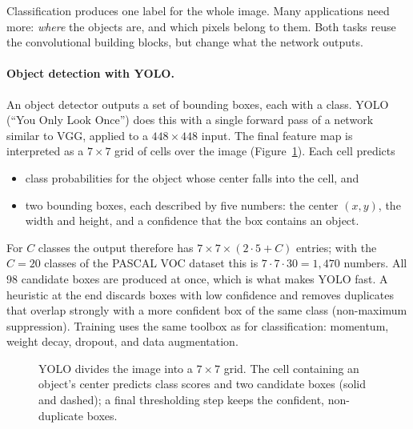 Classification produces one label for the whole image. Many applications need
more: \emph{where} the objects are, and which pixels belong to them. Both tasks
reuse the convolutional building blocks, but change what the network outputs.

\paragraph{Object detection with YOLO.}
An object detector outputs a set of bounding boxes, each with a class. YOLO
(``You Only Look Once'') does this with a single forward pass of a network
similar to VGG, applied to a $448\times448$ input. The final feature map is
interpreted as a $7\times7$ grid of cells over the image
(Figure~\ref{fig:yolo}). Each cell predicts
\begin{itemize}
  \item class probabilities for the object whose center falls into the cell, and
  \item two bounding boxes, each described by five numbers: the center $(x,y)$,
        the width and height, and a confidence that the box contains an object.
\end{itemize}
\noindent
For $C$ classes the output therefore has $7\times7\times(2\cdot5 + C)$ entries;
with the $C = 20$ classes of the PASCAL VOC dataset this is
$7\cdot7\cdot30 = 1{,}470$ numbers. All $98$ candidate boxes are produced at
once, which is what makes YOLO fast. A heuristic at the end discards boxes with
low confidence and removes duplicates that overlap strongly with a more
confident box of the same class (non-maximum suppression). Training uses the
same toolbox as for classification: momentum, weight decay, dropout, and data
augmentation.

\begin{figure}[ht]
  \centering
  \caption{YOLO divides the image into a $7\times7$ grid. The cell containing an
  object's center predicts class scores and two candidate boxes (solid and
  dashed); a final thresholding step keeps the confident, non-duplicate boxes.}
  \label{fig:yolo}
\end{figure}

